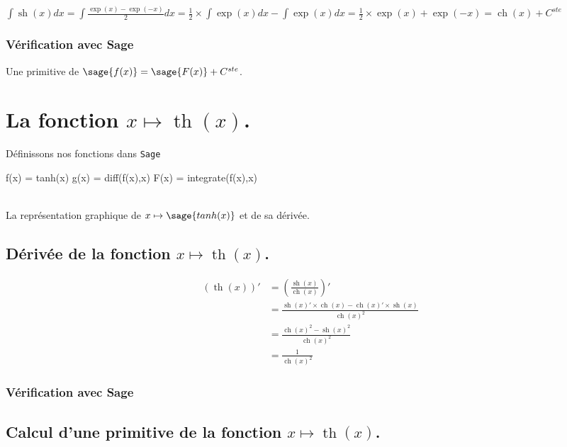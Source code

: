 \documentclass[a4paper,landscape,17pt]{extreport} %
\renewcommand{\sinh}{\mathop{\mathrm{sh}}}
\renewcommand{\cosh}{\mathop{\mathrm{ch}}}
\renewcommand{\tanh}{\mathop{\mathrm{th}}}
\begin{document}
$\int \sinh(x) dx = \int \frac{\exp(x)- \exp(-x)}{2} dx = \frac{1}{2} \times \int \exp(x) dx - \int \exp(x) dx = \frac{1}{2} \times \exp(x) + \exp(-x) = \cosh(x) + C^{ste}$


\subsubsection{Vérification avec Sage}

Une primitive de $\sage{f(x)} = \sage{F(x)} + C^{ste}$.


\section{La fonction  $x \mapsto \tanh(x)$.}

Définissons nos fonctions dans {\texttt{Sage}}
\begin{sageblock}
    f(x) = tanh(x)
    g(x) = diff(f(x),x)
    F(x) = integrate(f(x),x)
\end{sageblock}


\begin{center}
 \\
La représentation graphique de $x \mapsto \sage{tanh(x)} $ et de sa dérivée.
\end{center}

\subsection{Dérivée de la fonction $x \mapsto \tanh(x)$.}

\begin{align*}
(\tanh(x))' & =  \left(\frac{\sinh(x)}{\cosh(x)}\right)' \\
&  =  \frac{\sinh(x)' \times \cosh(x) - \cosh(x)' \times \sinh(x)}{\cosh(x)^2} \\ 
&  =   \frac{\cosh(x)^2 -\sinh(x)^2}{\cosh(x)^2} \\
&  =  \frac{1}{\cosh(x)^2}
\end{align*}


\subsubsection{Vérification avec Sage}


\subsection{Calcul d'une primitive de la fonction  $x \mapsto \tanh(x)$.}
\end{document}
